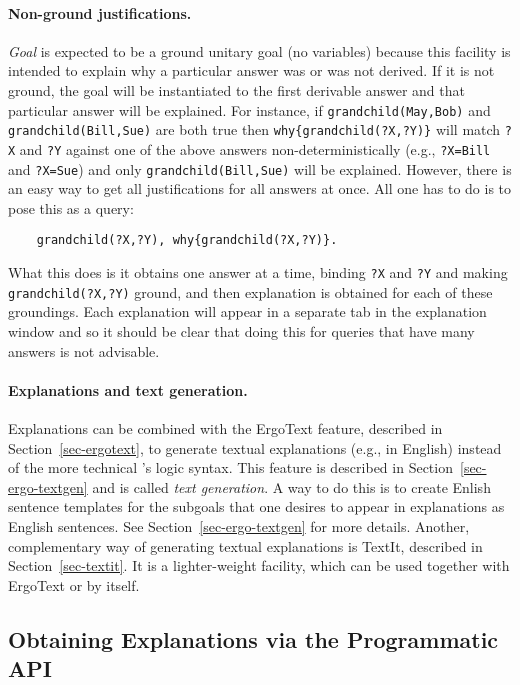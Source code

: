 \paragraph{Non-ground justifications.}
\emph{Goal} is expected to be a ground unitary goal
(no variables) because this facility
is intended to explain why a particular answer was or was not derived. If
it is not ground, the goal will be instantiated to the first derivable
answer and that particular answer will be explained. For instance, if
\texttt{grandchild(May,Bob)} and \texttt{grandchild(Bill,Sue)} are both
true then \texttt{why\{grandchild(?X,?Y)\}} will match \texttt{?X} and
\texttt{?Y} against one of the above
answers non-deterministically
(e.g., \texttt{?X=Bill} and \texttt{?X=Sue}) and only
\texttt{grandchild(Bill,Sue)} will be explained.    
However, there is an easy way to get all justifications for all answers at
once. All one has to do is to pose this as a query:
\begin{verbatim}
    grandchild(?X,?Y), why{grandchild(?X,?Y)}.
\end{verbatim}
What this does is it obtains one answer at a time, binding \texttt{?X} and
\texttt{?Y} and making \texttt{grandchild(?X,?Y)} ground, and then
explanation is obtained for each of these groundings. Each explanation will
appear in a separate tab in the explanation window and so it should be clear
that doing this for queries that have many answers is not advisable.

\paragraph{Explanations and text generation.}
Explanations can be combined with the ErgoText feature, described in
Section~\ref{sec-ergotext}, to generate textual explanations (e.g., in
English)
instead of the more technical \ERGO's logic syntax. This feature is described in
Section~\ref{sec-ergo-textgen} and is called \emph{text generation}.  
A way to do this is to create Enlish sentence templates for the
subgoals that one desires to appear in explanations as
English sentences. See
Section~\ref{sec-ergo-textgen} for more details.
Another, complementary way of generating textual explanations is TextIt,
described in Section~\ref{sec-textit}. It is a lighter-weight facility,
which can be used together with ErgoText or by itself.


\subsection{Obtaining Explanations via the \ERGO Programmatic API}

